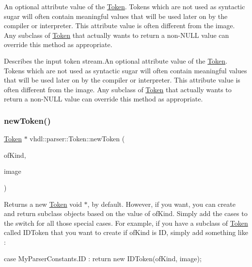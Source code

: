 An optional attribute value of the \mbox{\hyperlink{classvhdl_1_1parser_1_1_token}{Token}}. Tokens which are not used as syntactic sugar will often contain meaningful values that will be used later on by the compiler or interpreter. This attribute value is often different from the image. Any subclass of \mbox{\hyperlink{classvhdl_1_1parser_1_1_token}{Token}} that actually wants to return a non-\/\+N\+U\+LL value can override this method as appropriate.

Describes the input token stream.\+An optional attribute value of the \mbox{\hyperlink{classvhdl_1_1parser_1_1_token}{Token}}. Tokens which are not used as syntactic sugar will often contain meaningful values that will be used later on by the compiler or interpreter. This attribute value is often different from the image. Any subclass of \mbox{\hyperlink{classvhdl_1_1parser_1_1_token}{Token}} that actually wants to return a non-\/\+N\+U\+LL value can override this method as appropriate. \mbox{\label{classvhdl_1_1parser_1_1_token_af4f2850e46715e5ec1ddd430f9c5aaff}} 
\subsubsection{\texorpdfstring{newToken()}{newToken()}}
{\footnotesize\ttfamily \mbox{\hyperlink{classvhdl_1_1parser_1_1_token}{Token}} $\ast$ vhdl\+::parser\+::\+Token\+::new\+Token (\begin{DoxyParamCaption}\item[{int}]{of\+Kind,  }\item[{J\+A\+V\+A\+C\+C\+\_\+\+S\+T\+R\+I\+N\+G\+\_\+\+T\+Y\+PE}]{image }\end{DoxyParamCaption})\hspace{0.3cm}{\ttfamily [static]}}

Returns a new \mbox{\hyperlink{classvhdl_1_1parser_1_1_token}{Token}} void $\ast$, by default. However, if you want, you can create and return subclass objects based on the value of of\+Kind. Simply add the cases to the switch for all those special cases. For example, if you have a subclass of \mbox{\hyperlink{classvhdl_1_1parser_1_1_token}{Token}} called I\+D\+Token that you want to create if of\+Kind is ID, simply add something like \+:

case My\+Parser\+Constants.\+ID \+: return new I\+D\+Token(of\+Kind, image);

